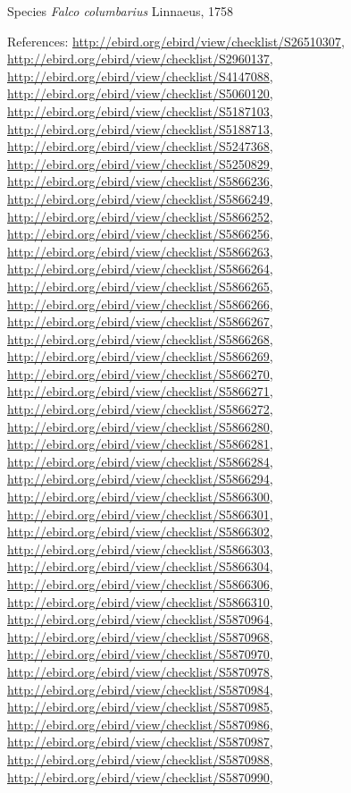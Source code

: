 \documentclass[9pt, article]{memoir}
\begin{document}
\begin{multicols}{2}
\vspace{6pt}\noindent\hspace{36pt}Species \textit{Falco columbarius} Linnaeus, 1758


\vspace{6pt}References: 
\url{http://ebird.org/ebird/view/checklist/S26510307}, 
\url{http://ebird.org/ebird/view/checklist/S2960137}, 
\url{http://ebird.org/ebird/view/checklist/S4147088}, 
\url{http://ebird.org/ebird/view/checklist/S5060120}, 
\url{http://ebird.org/ebird/view/checklist/S5187103}, 
\url{http://ebird.org/ebird/view/checklist/S5188713}, 
\url{http://ebird.org/ebird/view/checklist/S5247368}, 
\url{http://ebird.org/ebird/view/checklist/S5250829}, 
\url{http://ebird.org/ebird/view/checklist/S5866236}, 
\url{http://ebird.org/ebird/view/checklist/S5866249}, 
\url{http://ebird.org/ebird/view/checklist/S5866252}, 
\url{http://ebird.org/ebird/view/checklist/S5866256}, 
\url{http://ebird.org/ebird/view/checklist/S5866263}, 
\url{http://ebird.org/ebird/view/checklist/S5866264}, 
\url{http://ebird.org/ebird/view/checklist/S5866265}, 
\url{http://ebird.org/ebird/view/checklist/S5866266}, 
\url{http://ebird.org/ebird/view/checklist/S5866267}, 
\url{http://ebird.org/ebird/view/checklist/S5866268}, 
\url{http://ebird.org/ebird/view/checklist/S5866269}, 
\url{http://ebird.org/ebird/view/checklist/S5866270}, 
\url{http://ebird.org/ebird/view/checklist/S5866271}, 
\url{http://ebird.org/ebird/view/checklist/S5866272}, 
\url{http://ebird.org/ebird/view/checklist/S5866280}, 
\url{http://ebird.org/ebird/view/checklist/S5866281}, 
\url{http://ebird.org/ebird/view/checklist/S5866284}, 
\url{http://ebird.org/ebird/view/checklist/S5866294}, 
\url{http://ebird.org/ebird/view/checklist/S5866300}, 
\url{http://ebird.org/ebird/view/checklist/S5866301}, 
\url{http://ebird.org/ebird/view/checklist/S5866302}, 
\url{http://ebird.org/ebird/view/checklist/S5866303}, 
\url{http://ebird.org/ebird/view/checklist/S5866304}, 
\url{http://ebird.org/ebird/view/checklist/S5866306}, 
\url{http://ebird.org/ebird/view/checklist/S5866310}, 
\url{http://ebird.org/ebird/view/checklist/S5870964}, 
\url{http://ebird.org/ebird/view/checklist/S5870968}, 
\url{http://ebird.org/ebird/view/checklist/S5870970}, 
\url{http://ebird.org/ebird/view/checklist/S5870978}, 
\url{http://ebird.org/ebird/view/checklist/S5870984}, 
\url{http://ebird.org/ebird/view/checklist/S5870985}, 
\url{http://ebird.org/ebird/view/checklist/S5870986}, 
\url{http://ebird.org/ebird/view/checklist/S5870987}, 
\url{http://ebird.org/ebird/view/checklist/S5870988}, 
\url{http://ebird.org/ebird/view/checklist/S5870990}, 

\end{multicols}
\end{document}
